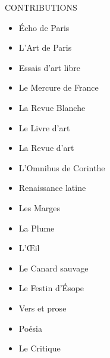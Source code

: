 CONTRIBUTIONS
\begin{itemize}
  \item Écho de Paris
  \item L’Art de Paris
  \item Essais d’art libre
  \item Le Mercure de France
  \item La Revue Blanche
  \item Le Livre d’art
  \item La Revue d’art
  \item L’Omnibus de Corinthe
  \item Renaissance latine
  \item Les Marges
  \item La Plume
  \item L'Œil
  \item Le Canard sauvage
  \item Le Festin d'Ésope
  \item Vers et prose
  \item Poésia
  \item Le Critique
\end{itemize}